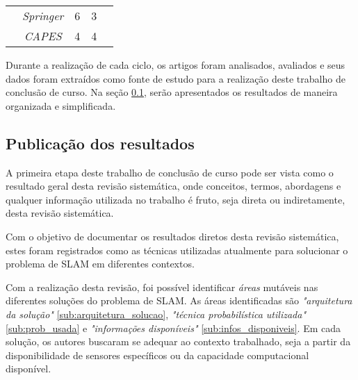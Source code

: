 \begin{table}[H]
\begin{tabular}{@{}c|c|c|c|c@{}}
                                 & \textit{Springer}                                                                   & 6                & 3                     &                                                                                                                                                                                              \\ \cline{2-4}
                                 & \textit{CAPES}                                                                      & 4                & 4                     &                                                                                                                                                                                              \\ \hline
\end{tabular}
\end{table}

Durante a realização de cada ciclo, os artigos foram analisados, avaliados e seus dados foram extraídos como fonte de estudo para a realização deste trabalho de conclusão de curso. Na seção \ref{sub:publicacaoRevisao}, serão apresentados os resultados de maneira organizada e simplificada.


	\subsection{Publicação dos resultados} %
	\label{sub:publicacaoRevisao}

		A primeira etapa deste trabalho de conclusão de curso pode ser vista como o resultado geral desta revisão sistemática, onde conceitos, termos, abordagens e qualquer informação utilizada no trabalho é fruto, seja direta ou indiretamente, desta revisão sistemática.

		Com o objetivo de documentar os resultados diretos desta revisão sistemática, estes foram registrados como as técnicas utilizadas atualmente para solucionar o problema de SLAM em diferentes contextos.

		Com a realização desta revisão, foi possível identificar \textit{áreas} mutáveis nas diferentes soluções do problema de SLAM. As áreas identificadas são \textit{"arquitetura da solução"} \ref{sub:arquitetura_solucao}, \textit{"técnica probabilística utilizada"} \ref{sub:prob_usada} e \textit{"informações disponíveis"} \ref{sub:infos_disponiveis}. Em cada solução, os autores buscaram se adequar ao contexto trabalhado, seja a partir da disponibilidade de sensores específicos ou da capacidade computacional disponível.


